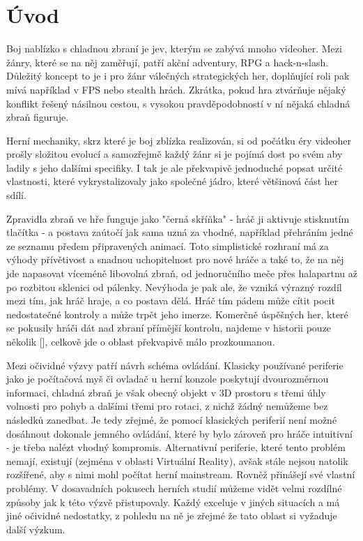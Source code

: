 \chapter*{Úvod}

Boj nablízko s chladnou zbraní je jev, kterým se zabývá mnoho videoher. Mezi žánry, které se na něj zaměřují, patří akční adventury, RPG a hack-n-slash. Důležitý koncept to je i pro žánr válečných strategických her, doplňující roli pak mívá například v FPS nebo stealth hrách. Zkrátka, pokud hra ztvárňuje nějaký konflikt řešený násilnou cestou, s vysokou pravděpodobností v ní nějaká chladná zbraň figuruje.

Herní mechaniky, skrz které je boj zblízka realizován, si od počátku éry videoher prošly složitou evolucí a samozřejmě každý žánr si je pojímá dost po svém aby ladily s jeho dalšími specifiky. I tak je ale překvapivě jednoduché popsat určité vlastnosti, které vykrystalizovaly jako společné jádro, které většinová část her sdílí.

Zpravidla zbraň ve hře funguje jako "černá skříňka" - hráč ji aktivuje stisknutím tlačítka - a postava zaútočí jak sama uzná za vhodné, například přehráním jedné ze seznamu předem připravených animací. Toto simplistické rozhraní má za výhody přívětivost a snadnou uchopitelnost pro nové hráče a také to, že na něj jde napasovat víceméně libovolná zbraň, od jednoručního meče přes halapartnu až po rozbitou sklenici od pálenky. Nevýhoda je pak ale, že vzniká výrazný rozdíl mezi tím, jak hráč hraje, a co postava dělá. Hráč tím pádem může cítit pocit nedostatečné kontroly a může trpět jeho imerze. Komerčně úspěšných her, které se pokusily hráči dát nad zbraní přímější kontrolu, najdeme v historii pouze několik [], celkově jde o oblast překvapivě málo prozkoumanou. 

Mezi očividné výzvy patří návrh schéma ovládání.  Klasicky používané periferie jako je počítačová myš či ovladač u herní konzole poskytují dvourozměrnou informaci, chladná zbraň je však obecný objekt v 3D prostoru s třemi úhly volnosti pro pohyb a dalšími třemi pro rotaci, z nichž žádný nemůžeme bez následků zanedbat. Je tedy zřejmé, že pomocí klasických periferií není možné dosáhnout dokonale jemného ovládání, které by bylo zároveň pro hráče intuitivní - je třeba nalézt vhodný kompromis. Alternativní periferie, které tento problém nemají, existují (zejména v oblasti Virtuální Reality), avšak stále nejsou natolik rozšířené, aby s nimi mohl počítat herní mainstream. Rovněž přinášejí své vlastní problémy. V dosavadních pokusech herních studií můžeme vidět velmi rozdílné způsoby jak k této výzvě přistupovaly. Každý exceluje v jiných situacích a má jiné očividné nedostatky, z pohledu na ně je zřejmé že tato oblast si vyžaduje další výzkum. 

